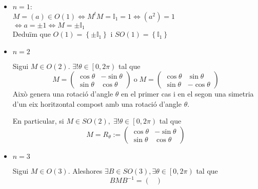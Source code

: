 \documentclass[../main.tex]{subfiles}
\begin{document}
	\begin{itemize}
	    \item $n = 1$:\\
	    $M = (a) \in O(1) \iff M^tM = \mathbb{I}_1 = 1 \iff (a^2) = 1$\\$\iff a = \pm 1 \iff M = \pm \mathbb{I}_1$\\
	    Deduïm que $O(1) = \left\{\pm \mathbb{I}_1\right\}$ i $SO(1) = \left\{\mathbb{I}_1\right\}$
	    \item $n = 2$
	    \begin{proposicio}
	        Sigui $M \in O(2)$. $\exists! \theta \in \left[0, 2\pi\right)$ tal que\\
	        \begin{displaymath}
	            M =
				\begin{pmatrix}
	                \cos{\theta} & -\sin{\theta}\\
	                \sin{\theta} & \cos{\theta}
				\end{pmatrix}
				\;\text{o}\;
				M =
				\begin{pmatrix}
	                \cos{\theta} & \sin{\theta}\\
	                \sin{\theta} & -\cos{\theta}
	            \end{pmatrix}
	        \end{displaymath}
	        Això genera una rotació d'angle $\theta$ en el primer cas i en el segon una simetria d'un
	        eix horitzontal compost amb una rotació d'angle $\theta$.
	    \end{proposicio}
	    \begin{obs}
	        En particular, si $M \in SO(2),\; \exists! \theta \in \left[0, 2\pi\right)$ tal que
	        \begin{displaymath}
	            M = R_\theta :=
				\begin{pmatrix}
	                \cos{\theta} & -\sin{\theta}\\
	                \sin{\theta} & \cos{\theta}
	            \end{pmatrix}
	        \end{displaymath}
	    \end{obs}
	    \item $n = 3$
	    \begin{proposicio}
	        Sigui $M \in O(3)$. Aleshores $\exists B \in SO(3), \exists \theta \in \left[0, 2\pi\right)$
	        tal que
			\begin{displaymath}
	            BMB^{-1} =
				\begin{pmatrix}

\end{pmatrix}
\end{displaymath}
\end{proposicio}
\end{itemize}
\end{document}
